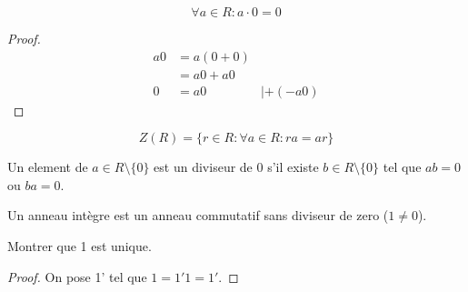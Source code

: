 \begin{theorem}
$$
\forall a\in R:a\cdot0=0
$$
\end{theorem}
\begin{proof}
\begin{align*}
a 0  & =a(0+0) \\
 & =a 0+a 0 \\
0 & =a0 & |+(-a 0)
\end{align*}

\end{proof}
\begin{definition}[Centre de $R$]
$$
Z(R)=\{ r\in R:\forall a\in R:ra=ar \}$$
\end{definition}
\begin{definition}[Diviseur de 0]
Un element de $a\in R\setminus \{ 0 \}$ est un diviseur de 0 s'il existe $b\in R\setminus \{ 0 \}$ tel que $ab=0$ ou $ba=0$.
\end{definition}
\begin{definition}
Un anneau intègre est un anneau commutatif sans diviseur de zero ($1\neq 0$).
\end{definition}
\begin{example}
Montrer que 1 est unique.

\begin{proof}
On pose 1' tel que $1=1'1=1'$.
\end{proof}
\end{example}
